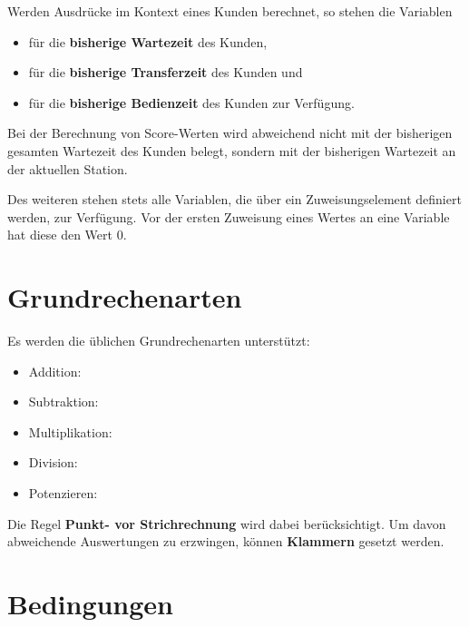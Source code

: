 Werden Ausdrücke im Kontext eines Kunden berechnet, so stehen die Variablen
\begin{itemize}
\item
{} für die \textbf{bisherige Wartezeit} des Kunden,
\item
{} für die \textbf{bisherige Transferzeit} des Kunden und
\item
{} für die \textbf{bisherige Bedienzeit} des Kunden zur Verfügung.
\end{itemize}

Bei der Berechnung von Score-Werten wird  abweichend nicht mit der bisherigen
gesamten Wartezeit des Kunden belegt, sondern mit der bisherigen Wartezeit an der aktuellen Station.

Des weiteren stehen stets alle Variablen, die über ein Zuweisungselement definiert werden, zur Verfügung.
Vor der ersten Zuweisung eines Wertes an eine Variable hat diese den Wert 0.



\chapter{Grundrechenarten}

Es werden die üblichen Grundrechenarten unterstützt:
\begin{itemize}
\item Addition: \cmd{$+$}
\item Subtraktion: \cmd{$-$}
\item Multiplikation: \cmd{$*$}
\item Division: \cmd{$/$}
\item Potenzieren: \cmd{$\hat~$}
\end{itemize}

Die Regel \textbf{Punkt- vor Strichrechnung} wird dabei berücksichtigt.
Um davon abweichende Auswertungen zu erzwingen, können \textbf{Klammern}
gesetzt werden.



\chapter{Bedingungen}

